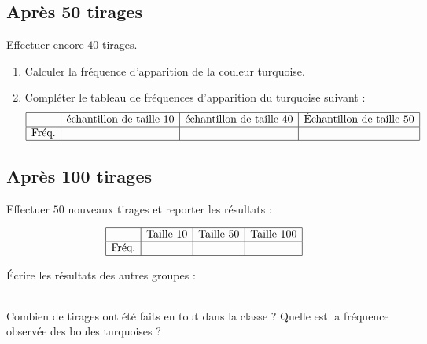 \subsection*{Après 50 tirages}

Effectuer encore \( 40\) tirages.
\begin{enumerate}
    \item
        Calculer la fréquence d'apparition de la couleur turquoise.
    \item
        Compléter le tableau de fréquences d'apparition du turquoise suivant :
        \begin{equation*}
            \begin{array}[]{|c|c|c|c|}
                \hline
                &\text{échantillon de taille 10}&\text{échantillon de taille 40}&\text{Échantillon de taille 50}\\
                  \hline
                  \text{Fréq.}&&&\\ 
                  \hline 
                   \end{array}
               \end{equation*}
               
\end{enumerate}

\subsection*{Après 100 tirages}

Effectuer \( 50\) nouveaux tirages et reporter les résultats :

\begin{equation*}
    \begin{array}[]{|c|c|c|c|}
      \hline
        &\text{Taille 10}&\text{Taille 50}&\text{Taille 100}\\
       \hline
       \text{Fréq.}&&&\\ 
       \hline 
  \end{array}
\end{equation*}
               
Écrire les résultats des autres groupes :
        \begin{tabular}[]{|c|c|c|c|c|c|c|c|c|c|}
        \hline
        &&&&&&&&\\
        \hline
    \end{tabular}

Combien de tirages ont été faits en tout dans la classe ? Quelle est la fréquence observée des boules turquoises ?
